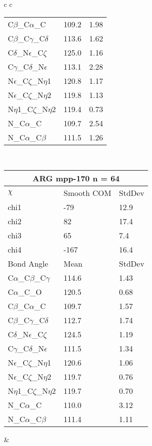 \begin{longtable}{ c c }
\begin{tabular}{ l l l }
  C$\beta$\_C$\alpha$\_C & 109.2 & 1.98\\
  C$\beta$\_C$\gamma$\_C$\delta$ & 113.6 & 1.62\\
  C$\delta$\_N$\epsilon$\_C$\zeta$ & 125.0 & 1.16\\
  C$\gamma$\_C$\delta$\_N$\epsilon$ & 113.1 & 2.28\\
  N$\epsilon$\_C$\zeta$\_N$\eta$1 & 120.8 & 1.17\\
  N$\epsilon$\_C$\zeta$\_N$\eta$2 & 119.8 & 1.13\\
  N$\eta$1\_C$\zeta$\_N$\eta$2 & 119.4 & 0.73\\
  N\_C$\alpha$\_C & 109.7 & 2.54\\
  N\_C$\alpha$\_C$\beta$ & 111.5 & 1.26\\
  \bottomrule
  \end{tabular}
  \\
  \begin{tabular}{ l l l }
  \toprule
  \multicolumn{3}{c}{ARG \textbf{mpp-170} n = 64} \\ \toprule
  $\chi$       & Smooth COM & StdDev \\ \midrule
  chi1 & -79 & 12.9 \\ 
  chi2 & 82 & 17.4 \\ 
  chi3 & 65 & 7.4 \\ 
  chi4 & -167 & 16.4 \\ \midrule
  Bond Angle   & Mean     & StdDev \\ \midrule
  C$\alpha$\_C$\beta$\_C$\gamma$ & 114.6 & 1.43\\
  C$\alpha$\_C\_O & 120.5 & 0.68\\
  C$\beta$\_C$\alpha$\_C & 109.7 & 1.57\\
  C$\beta$\_C$\gamma$\_C$\delta$ & 112.7 & 1.74\\
  C$\delta$\_N$\epsilon$\_C$\zeta$ & 124.5 & 1.19\\
  C$\gamma$\_C$\delta$\_N$\epsilon$ & 111.5 & 1.34\\
  N$\epsilon$\_C$\zeta$\_N$\eta$1 & 120.6 & 1.06\\
  N$\epsilon$\_C$\zeta$\_N$\eta$2 & 119.7 & 0.76\\
  N$\eta$1\_C$\zeta$\_N$\eta$2 & 119.7 & 0.70\\
  N\_C$\alpha$\_C & 110.0 & 3.12\\
  N\_C$\alpha$\_C$\beta$ & 111.4 & 1.11\\
  \bottomrule
  \end{tabular}
  &
  \begin{tabular}{ l l l }

\end{tabular}
\end{longtable}
